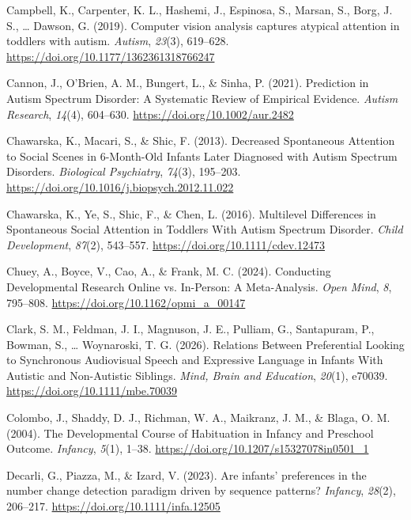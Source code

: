 \documentclass[
  english,
  man,floatsintext]{apa6}
\newlength{\cslhangindent}
\newenvironment{CSLReferences}[2] %
 {\begin{list}{}{%
  \setlength{\itemindent}{0pt}
  \setlength{\leftmargin}{0pt}
  \setlength{\parsep}{0pt}
  \ifodd #1
   \setlength{\leftmargin}{\cslhangindent}
   \setlength{\itemindent}{-1\cslhangindent}
  \fi
  \setlength{\itemsep}{#2\baselineskip}}}
 {\end{list}}
\begin{document}
\begin{CSLReferences}{1}{0}
Campbell, K., Carpenter, K. L., Hashemi, J., Espinosa, S., Marsan, S., Borg, J. S., \ldots{} Dawson, G. (2019). Computer vision analysis captures atypical attention in toddlers with autism. \emph{Autism}, \emph{23}(3), 619--628. \url{https://doi.org/10.1177/1362361318766247}

Cannon, J., O'Brien, A. M., Bungert, L., \& Sinha, P. (2021). Prediction in {Autism Spectrum Disorder}: {A Systematic Review} of {Empirical Evidence}. \emph{Autism Research}, \emph{14}(4), 604--630. \url{https://doi.org/10.1002/aur.2482}

Chawarska, K., Macari, S., \& Shic, F. (2013). Decreased {Spontaneous Attention} to {Social Scenes} in 6-{Month-Old Infants Later Diagnosed} with {Autism Spectrum Disorders}. \emph{Biological Psychiatry}, \emph{74}(3), 195--203. \url{https://doi.org/10.1016/j.biopsych.2012.11.022}

Chawarska, K., Ye, S., Shic, F., \& Chen, L. (2016). Multilevel {Differences} in {Spontaneous Social Attention} in {Toddlers With Autism Spectrum Disorder}. \emph{Child Development}, \emph{87}(2), 543--557. \url{https://doi.org/10.1111/cdev.12473}

Chuey, A., Boyce, V., Cao, A., \& Frank, M. C. (2024). Conducting {Developmental Research Online} vs. {In-Person}: {A Meta-Analysis}. \emph{Open Mind}, \emph{8}, 795--808. \url{https://doi.org/10.1162/opmi_a_00147}

Clark, S. M., Feldman, J. I., Magnuson, J. E., Pulliam, G., Santapuram, P., Bowman, S., \ldots{} Woynaroski, T. G. (2026). Relations {Between Preferential Looking} to {Synchronous Audiovisual Speech} and {Expressive Language} in {Infants With Autistic} and {Non}-{Autistic Siblings}. \emph{Mind, Brain and Education}, \emph{20}(1), e70039. \url{https://doi.org/10.1111/mbe.70039}

Colombo, J., Shaddy, D. J., Richman, W. A., Maikranz, J. M., \& Blaga, O. M. (2004). The {Developmental Course} of {Habituation} in {Infancy} and {Preschool Outcome}. \emph{Infancy}, \emph{5}(1), 1--38. \url{https://doi.org/10.1207/s15327078in0501_1}

Decarli, G., Piazza, M., \& Izard, V. (2023). Are infants' preferences in the number change detection paradigm driven by sequence patterns? \emph{Infancy}, \emph{28}(2), 206--217. \url{https://doi.org/10.1111/infa.12505}


\end{CSLReferences}
\end{document}
